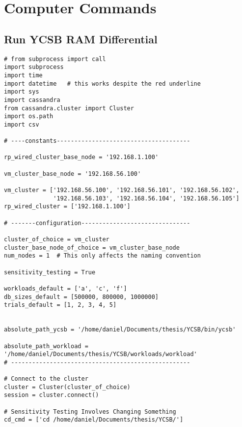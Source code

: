 
\chapter{Computer Commands} %

\label{PythonCode} 






\section{Run YCSB RAM Differential}

\begin{verbatim}
# from subprocess import call
import subprocess
import time
import datetime   # this works despite the red underline
import sys
import cassandra
from cassandra.cluster import Cluster
import os.path
import csv

# ----constants--------------------------------------

rp_wired_cluster_base_node = '192.168.1.100'

vm_cluster_base_node = '192.168.56.100'

vm_cluster = ['192.168.56.100', '192.168.56.101', '192.168.56.102',
              '192.168.56.103', '192.168.56.104', '192.168.56.105']
rp_wired_cluster = ['192.168.1.100']

# -------configuration-------------------------------

cluster_of_choice = vm_cluster
cluster_base_node_of_choice = vm_cluster_base_node
num_nodes = 1  # This only affects the naming convention

sensitivity_testing = True

workloads_default = ['a', 'c', 'f']
db_sizes_default = [500000, 800000, 1000000]
trials_default = [1, 2, 3, 4, 5]


absolute_path_ycsb = '/home/daniel/Documents/thesis/YCSB/bin/ycsb'

absolute_path_workload = '/home/daniel/Documents/thesis/YCSB/workloads/workload'
# ---------------------------------------------------

# Connect to the cluster
cluster = Cluster(cluster_of_choice)
session = cluster.connect()

# Sensitivity Testing Involves Changing Something
cd_cmd = ['cd /home/daniel/Documents/thesis/YCSB/']



\end{verbatim}
